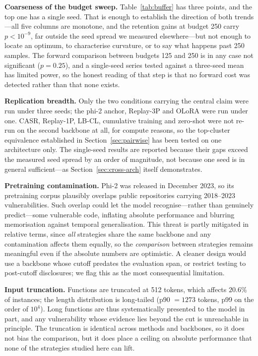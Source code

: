 \documentclass[a4paper,twoside]{article}
\begin{document}
\textbf{Coarseness of the budget sweep.} Table~\ref{tab:buffer} has three points, and the top one has a single seed. That is enough to establish the direction of both trends---all five columns are monotone, and the retention gains at budget 250 carry $p<10^{-9}$, far outside the seed spread we measured elsewhere---but not enough to locate an optimum, to characterise curvature, or to say what happens past 250 samples. The forward comparison between budgets 125 and 250 is in any case not significant ($p=0.25$), and a single-seed series tested against a three-seed mean has limited power, so the honest reading of that step is that no forward cost was detected rather than that none exists.

\textbf{Replication breadth.} Only the two conditions carrying the central claim were run under three seeds; the phi-2 anchor, Replay-3P and OLoRA were run under one. CASR, Replay-1P, LB-CL, cumulative training and zero-shot were not re-run on the second backbone at all, for compute reasons, so the top-cluster equivalence established in Section~\ref{sec:pairwise} has been tested on one architecture only. The single-seed results are reported because their gaps exceed the measured seed spread by an order of magnitude, not because one seed is in general sufficient---as Section~\ref{sec:cross-arch} itself demonstrates.

\textbf{Pretraining contamination.} Phi-2 was released in December 2023, so its pretraining corpus plausibly overlaps public repositories carrying 2018--2023 vulnerabilities. Such overlap could let the model recognise---rather than genuinely predict---some vulnerable code, inflating absolute performance and blurring memorisation against temporal generalisation. This threat is partly mitigated in relative terms, since \emph{all} strategies share the same backbone and any contamination affects them equally, so the \emph{comparison} between strategies remains meaningful even if the absolute numbers are optimistic. A cleaner design would use a backbone whose cutoff predates the evaluation span, or restrict testing to post-cutoff disclosures; we flag this as the most consequential limitation.

\textbf{Input truncation.} Functions are truncated at 512 tokens, which affects $20.6\%$ of instances; the length distribution is long-tailed (p90 $=1273$ tokens, p99 on the order of $10^4$). Long functions are thus systematically presented to the model in part, and any vulnerability whose evidence lies beyond the cut is unreachable in principle. The truncation is identical across methods and backbones, so it does not bias the comparison, but it does place a ceiling on absolute performance that none of the strategies studied here can lift.
\end{document}
